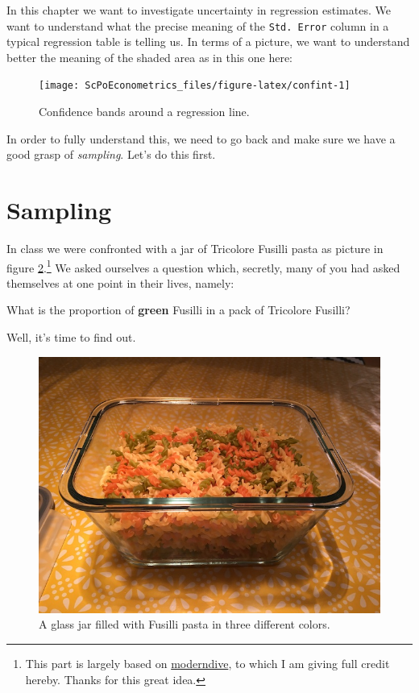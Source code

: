 \documentclass[]{book}
\let\rmarkdownfootnote\footnote%
\def\footnote{\protect\rmarkdownfootnote}
\newenvironment{tip}{\begin{tcolorbox}[colback=green!5!white,colframe=green]}{\end{tcolorbox}}
\begin{document}
In this chapter we want to investigate uncertainty in regression estimates. We want to understand what the precise meaning of the \texttt{Std.\ Error} column in a typical regression table is telling us. In terms of a picture, we want to understand better the meaning of the shaded area as in this one here:

\begin{figure}

{\centering \texttt{[image: ScPoEconometrics\_files/figure-latex/confint-1]} 

}

\caption{Confidence bands around a regression line.}\label{fig:confint}
\end{figure}

In order to fully understand this, we need to go back and make sure we have a good grasp of \emph{sampling}. Let's do this first.

\hypertarget{sampling}{%
\section{Sampling}\label{sampling}}

In class we were confronted with a jar of Tricolore Fusilli pasta as picture in figure \ref{fig:pasta1}.\footnote{This part is largely based on \href{https://moderndive.com/7-sampling.html}{moderndive}, to which I am giving full credit hereby. Thanks for this great idea.} We asked ourselves a question which, secretly, many of you had asked themselves at one point in their lives, namely:

\begin{tip}
What is the proportion of \textbf{green} Fusilli in a pack of Tricolore
Fusilli?
\end{tip}

Well, it's time to find out.

\begin{figure}

{\centering \includegraphics[width=0.9\linewidth]{images/pasta1} 

}

\caption{A glass jar filled with Fusilli pasta in three different colors.}\label{fig:pasta1}
\end{figure}
\end{document}
